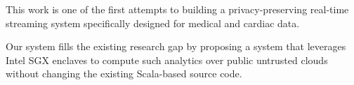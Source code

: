 This work is one of the first attempts to building a privacy-preserving real-time streaming system specifically designed for  medical and cardiac data. 

Our system fills the existing research gap by proposing a system that leverages Intel SGX enclaves to compute such analytics over public untrusted clouds without changing the existing Scala-based source code.
